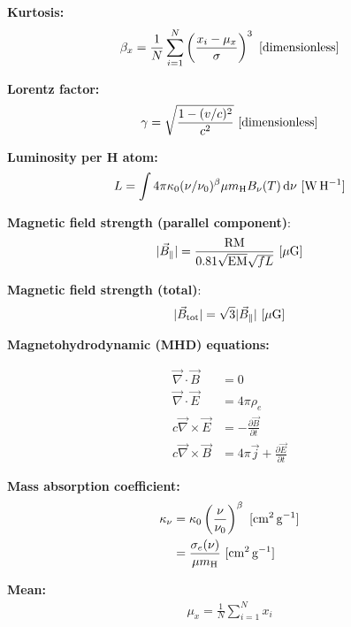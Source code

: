 \documentclass[a4paper,10pt]{article}
\begin{document}
{\noindent}\textbf{Kurtosis:}
\begin{align*}
    \beta_x = \frac{1}{N} \sum_{i=1}^N \left(\frac{x_i-\mu_x}{\sigma}\right)^3 ~ [{\rm dimensionless}]
\end{align*}

{\noindent}\textbf{Lorentz factor:}
\begin{align*}
    \gamma = \sqrt{\frac{1 - (v/c)^2}{c^2}} ~ [{\rm dimensionless}]
\end{align*}

{\noindent}\textbf{Luminosity per H atom:}
\begin{align*}
    L = \int 4\pi\kappa_0(\nu/\nu_0)^\beta \mu m_{\rm H}B_\nu(T) \,{\rm d}\nu ~ [{\rm W\,H^{-1}}]
\end{align*}

{\noindent}\textbf{Magnetic field strength (parallel component)}:
\begin{align*}
    \lvert\vec{B}_\parallel\rvert = \frac{\rm RM}{0.81\sqrt{\rm EM}\sqrt{fL}} ~[{\rm \mu G]}
\end{align*}

{\noindent}\textbf{Magnetic field strength (total)}:
\begin{align*}
    \lvert\vec{B}_{\rm tot}\rvert = \sqrt{3}\lvert\vec{B}_\parallel\rvert ~[{\rm \mu G]}
\end{align*}

{\noindent}\textbf{Magnetohydrodynamic (MHD) equations:}

\begin{align*}
    \vec\nabla\cdot\vec{B} &= 0 \\
    \vec\nabla\cdot\vec{E} &= 4\pi\rho_e \\
    c\vec\nabla\times\vec{E} &= - \frac{\partial\vec{B}}{\partial t} \\
    c\vec\nabla\times\vec{B} &= 4\pi\vec{j} + \frac{\partial\vec{E}}{\partial t}
\end{align*}

{\noindent}\textbf{Mass absorption coefficient:}
\begin{align*}
    \kappa_\nu &= \kappa_0 \left(\frac{\nu}{\nu_0}\right)^\beta ~ [{\rm cm^2\,g^{-1}}] \\
                       &= \frac{\sigma_e(\nu)}{\mu m_{\rm H}} ~ [{\rm cm^2\,g^{-1}}]
\end{align*}

{\noindent}\textbf{Mean:} 
\begin{align*}
    \mu_x = \frac{1}{N} \sum_{i=1}^N x_i
\end{align*}
\end{document}

